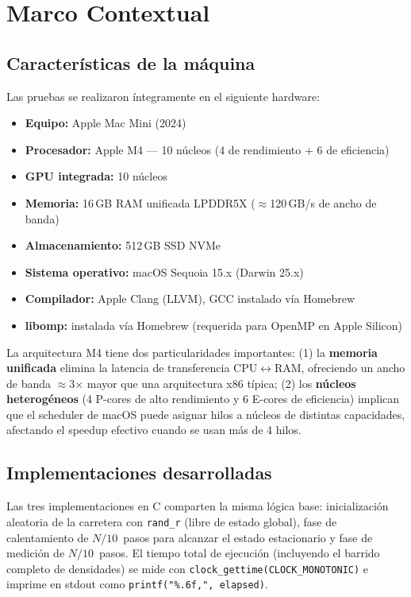 \documentclass{article}
\begin{document}
\section{Marco Contextual}

\subsection{Caracter\'isticas de la m\'aquina}

Las pruebas se realizaron \'integramente en el siguiente hardware:

\begin{itemize}
    \item \textbf{Equipo:} Apple Mac Mini (2024)
    \item \textbf{Procesador:} Apple M4 --- 10 n\'ucleos (4 de rendimiento + 6 de
          eficiencia)
    \item \textbf{GPU integrada:} 10 n\'ucleos
    \item \textbf{Memoria:} 16\,GB RAM unificada LPDDR5X
          ($\approx$120\,GB/s de ancho de banda) \cite{apple_m4}
    \item \textbf{Almacenamiento:} 512\,GB SSD NVMe
    \item \textbf{Sistema operativo:} macOS Sequoia 15.x (Darwin 25.x)
    \item \textbf{Compilador:} Apple Clang (LLVM), GCC instalado v\'ia Homebrew
    \item \textbf{libomp:} instalada v\'ia Homebrew (requerida para OpenMP en Apple
          Silicon)
\end{itemize}

La arquitectura M4 tiene dos particularidades importantes: (1) la \textbf{memoria
unificada} elimina la latencia de transferencia CPU$\leftrightarrow$RAM, ofreciendo un
ancho de banda $\approx$3$\times$ mayor que una arquitectura x86 t\'ipica; (2) los
\textbf{n\'ucleos heterog\'eneos} (4 P-cores de alto rendimiento y 6 E-cores de
eficiencia) implican que el scheduler de macOS puede asignar hilos a n\'ucleos de
distintas capacidades, afectando el speedup efectivo cuando se usan m\'as de 4 hilos.

\subsection{Implementaciones desarrolladas}

Las tres implementaciones en C comparten la misma l\'ogica base: inicializaci\'on
aleatoria de la carretera con \texttt{rand\_r} (libre de estado global), fase de
calentamiento de $N/10$~pasos para alcanzar el estado estacionario y fase de medici\'on
de $N/10$~pasos. El tiempo total de ejecuci\'on (incluyendo el barrido completo de
densidades) se mide con \texttt{clock\_gettime(CLOCK\_MONOTONIC)} e imprime en stdout
como \texttt{printf("\%.6f,", elapsed)}.
\end{document}
